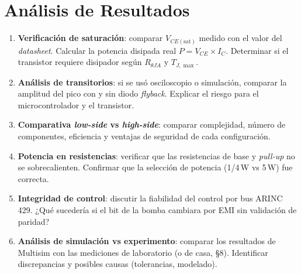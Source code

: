 \documentclass[11pt]{article}
\begin{document}
\section{Análisis de Resultados}
\begin{enumerate}
  \item \textbf{Verificación de saturación}: comparar $V_{CE(\text{sat})}$ medido con el
        valor del \emph{datasheet}. Calcular la potencia disipada real
        $P=V_{CE}\times I_C$. Determinar si el transistor requiere disipador según
        $R_{\theta JA}$ y $T_{J,\max}$.
  \item \textbf{Análisis de transitorios}: si se usó osciloscopio o simulación, comparar
        la amplitud del pico con y sin diodo \emph{flyback}. Explicar el riesgo para el
        microcontrolador y el transistor.
  \item \textbf{Comparativa \emph{low-side} vs \emph{high-side}}: comparar complejidad,
        número de componentes, eficiencia y ventajas de seguridad de cada configuración.
  \item \textbf{Potencia en resistencias}: verificar que las resistencias de base y
        \emph{pull-up} no se sobrecalienten. Confirmar que la selección de potencia
        (1/4\,W vs 5\,W) fue correcta.
  \item \textbf{Integridad de control}: discutir la fiabilidad del control por bus
        ARINC 429. ¿Qué sucedería si el bit de la bomba cambiara por EMI sin validación
        de paridad?
  \item \textbf{Análisis de simulación vs experimento}: comparar los resultados de
        Multisim con las mediciones de laboratorio (o de casa, \S8). Identificar
        discrepancias y posibles causas (tolerancias, modelado).
\end{enumerate}

\end{document}
